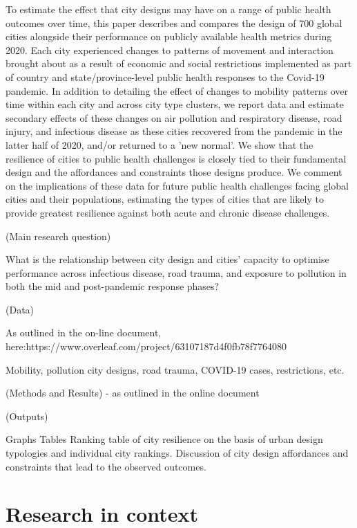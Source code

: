 \documentclass[preprint,12pt]{elsarticle}
\begin{document}
To estimate the effect that city designs may have on a range of public health outcomes over time, this paper describes and compares the design of 700 global cities alongside their performance on publicly available health metrics during 2020. Each city experienced changes to patterns of movement and interaction brought about as a result of economic and social restrictions implemented as part of country and state/province-level public health responses to the Covid-19 pandemic. In addition to detailing the effect of changes to mobility patterns over time within each city and across city type clusters, we report data and estimate secondary effects of these changes on air pollution and respiratory disease, road injury, and infectious disease as these cities recovered from the pandemic in the latter half of 2020, and/or returned to a 'new normal'. We show that the resilience of cities to public health challenges is closely tied to their fundamental design and the affordances and constraints those designs produce. We comment on the implications of these data for future public health challenges facing global cities and their populations, estimating the types of cities that are likely to provide greatest resilience against both acute and chronic disease challenges. 

(Main research question)

What is the relationship between city design and cities’ capacity to optimise performance across infectious disease, road trauma, and exposure to pollution in both the mid and post-pandemic response phases?

(Data)

As outlined in the on-line document, here:https://www.overleaf.com/project/63107187d4f0fb78f7764080

Mobility, pollution city designs, road trauma, COVID-19 cases, restrictions, etc.

(Methods and Results) - as outlined in the online document

(Outputs)

    Graphs
    Tables
    Ranking table of city resilience on the basis of urban design typologies and individual city rankings.
    Discussion of city design affordances and constraints that lead to the observed outcomes.



\section*{Research in context}
\end{document}
